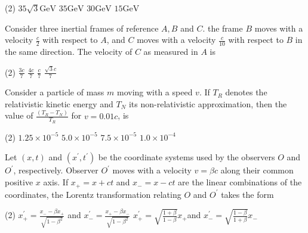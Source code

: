 \begin{enumerate}
\begin{minipage}{\textwidth}
\end{minipage}
\begin{tasks}(2)
	\task[\textbf{A.}] $35 \sqrt{3} \mathrm{GeV}$
	\task[\textbf{B.}]$35 \mathrm{GeV}$
	\task[\textbf{C.}]$30 \mathrm{GeV}$
	\task[\textbf{D.}]$15 \mathrm{GeV}$
\end{tasks}
\begin{minipage}{\textwidth}
	\item Consider three inertial frames of reference $A, B$ and $C$. the frame $B$ moves with a velocity $\frac{c}{2}$ with respect to $A$, and $C$ moves with a velocity $\frac{c}{10}$ with respect to $B$ in the same direction. The velocity of $C$ as measured in $A$ is
\end{minipage}
\begin{tasks}(2)
	\task[\textbf{A.}] $\frac{3 c}{7}$
	\task[\textbf{B.}]$\frac{4 c}{7}$
	\task[\textbf{C.}]$\frac{c}{7}$
	\task[\textbf{D.}] $\frac{\sqrt{3} c}{7}$
\end{tasks}
\begin{minipage}{\textwidth}
	\item Consider a particle of mass $m$ moving with a speed $v$. If $T_{R}$ denotes the relativistic kinetic energy and $T_{N}$ its non-relativistic approximation, then the value of $\frac{\left(T_{R}-T_{N}\right)}{T_{R}}$ for $v=0.01 c$, is
\end{minipage}
\begin{tasks}(2)
	\task[\textbf{A.}] $1.25 \times 10^{-5}$
	\task[\textbf{B.}]$5.0 \times 10^{-5}$
	\task[\textbf{C.}]$7.5 \times 10^{-5}$
	\task[\textbf{D.}]$1.0 \times 10^{-4}$
\end{tasks}
\begin{minipage}{\textwidth}
	\item Let $(x, t)$ and $\left(x^{\prime}, t^{\prime}\right)$ be the coordinate systems used by the observers $O$ and $O^{\prime}$, respectively. Observer $O^{\prime}$ moves with a velocity $v=\beta c$ along their common positive $x$ axis. If $x_{+}=x+c t$ and $x_{-}=x-c t$ are the linear combinations of the coordinates, the Lorentz transformation relating $O$ and $O^{\prime}$ takes the form
\end{minipage}
\begin{tasks}(2)
	\task[\textbf{A.}] $x_{+}^{\prime}=\frac{x_{-}-\beta x_{+}}{\sqrt{1-\beta^{2}}}$ and $x_{-}^{\prime}=\frac{x_{+}-\beta x_{-}}{\sqrt{1-\beta^{2}}}$
	\task[\textbf{B.}]$x_{+}^{\prime}=\sqrt{\frac{1+\beta}{1-\beta}} x_{+}$and $x_{-}^{\prime}=\sqrt{\frac{1-\beta}{1+\beta}} x_{-}$

\end{tasks}
\end{enumerate}
